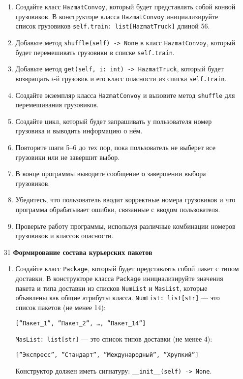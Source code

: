 \begin{enumerate}
\begin{enumerate}
    \item Создайте класс \texttt{HazmatConvoy}, который будет представлять собой конвой грузовиков. В конструкторе класса \texttt{HazmatConvoy} инициализируйте список грузовиков \texttt{self.train: list[HazmatTruck]} длиной 56.

    \item Добавьте метод \texttt{shuffle(self) -> None} в класс \texttt{HazmatConvoy}, который будет перемешивать грузовики в списке \texttt{self.train}.

    \item Добавьте метод \texttt{get(self, i: int) -> HazmatTruck}, который будет возвращать $i$-й грузовик и его класс опасности из списка \texttt{self.train}.

    \item Создайте экземпляр класса \texttt{HazmatConvoy} и вызовите метод \texttt{shuffle} для перемешивания грузовиков.

    \item Создайте цикл, который будет запрашивать у пользователя номер грузовика и выводить информацию о нём.

    \item Повторите шаги 5–6 до тех пор, пока пользователь не выберет все грузовики или не завершит выбор.

    \item В конце программы выводите сообщение о завершении выбора грузовиков.

    \item Убедитесь, что пользователь вводит корректные номера грузовиков и что программа обрабатывает ошибки, связанные с вводом пользователя.

    \item Проверьте работу программы, используя различные комбинации номеров грузовиков и классов опасности.
\end{enumerate}

\item[31] \textbf{Формирование состава курьерских пакетов}
\begin{enumerate}
    \item Создайте класс \texttt{Package}, который будет представлять собой пакет с типом доставки. В конструкторе класса \texttt{Package} инициализируйте значения пакета и типа доставки из списков \texttt{NumList} и \texttt{MasList}, которые объявлены как общие атрибуты класса. \texttt{NumList: list[str]} — это список пакетов (не менее 14): 
    \begin{center}
        \texttt{[''Пакет\_1'', ''Пакет\_2'', \dots, ''Пакет\_14'']}
    \end{center}
    \texttt{MasList: list[str]} — это список типов доставки (не менее 4):
    \begin{center}
        \texttt{[''Экспресс'', ''Стандарт'', ''Международный'', ''Хрупкий'']}
    \end{center}
    Конструктор должен иметь сигнатуру: \texttt{\_\_init\_\_(self) -> None}.


\end{enumerate}
\end{enumerate}
